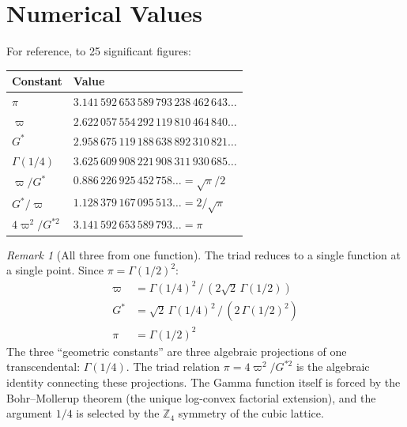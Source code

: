 \documentclass[12pt]{article}
\theoremstyle{definition}
\theoremstyle{remark}
\newtheorem{remark}[theorem]{Remark}
\begin{document}
\section{Numerical Values}
\label{sec:values}

For reference, to 25 significant figures:

\begin{center}
\renewcommand{\arraystretch}{1.3}
\begin{tabular}{@{}ll@{}}
\toprule
\textbf{Constant} & \textbf{Value} \\
\midrule
$\pi$ & $3.141\,592\,653\,589\,793\,238\,462\,643\ldots$ \\
$\varpi$ & $2.622\,057\,554\,292\,119\,810\,464\,840\ldots$ \\
$G^*$ & $2.958\,675\,119\,188\,638\,892\,310\,821\ldots$ \\
$\Gamma(1/4)$ & $3.625\,609\,908\,221\,908\,311\,930\,685\ldots$ \\
\midrule
$\varpi/G^*$ & $0.886\,226\,925\,452\,758\ldots = \sqrt{\pi}/2$ \\
$G^*/\varpi$ & $1.128\,379\,167\,095\,513\ldots = 2/\sqrt{\pi}$ \\
$4\varpi^2/G^{*2}$ & $3.141\,592\,653\,589\,793\ldots = \pi$ \\
\bottomrule
\end{tabular}
\end{center}

\begin{remark}[All three from one function]
The triad reduces to a single function at a single point. Since $\pi = \Gamma(1/2)^2$:
\begin{align}
    \varpi &= \Gamma(1/4)^2\,/\,(2\sqrt{2}\,\Gamma(1/2)) \\
    G^* &= \sqrt{2}\,\Gamma(1/4)^2\,/\,(2\,\Gamma(1/2)^2) \\
    \pi &= \Gamma(1/2)^2
\end{align}
The three ``geometric constants'' are three algebraic projections of one transcendental: $\Gamma(1/4)$. The triad relation $\pi = 4\varpi^2/G^{*2}$ is the algebraic identity connecting these projections. The Gamma function itself is forced by the Bohr--Mollerup theorem (the unique log-convex factorial extension), and the argument $1/4$ is selected by the $\mathbb{Z}_4$ symmetry of the cubic lattice.
\end{remark}
\end{document}
